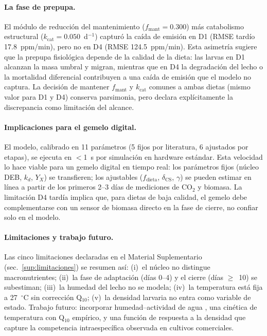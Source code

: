\paragraph{La fase de prepupa.}
El m\'{o}dulo de reducci\'{o}n del mantenimiento ($f_{\mathrm{mant}}=0.300$)
m\'{a}s catabolismo estructural ($k_{\mathrm{cat}}=0.050$~d$^{-1}$)
captur\'{o} la ca\'{i}da de emisi\'{o}n en D1 (RMSE tard\'{i}o 17.8~ppm/min),
pero no en D4 (RMSE 124.5~ppm/min). Esta asimetr\'{i}a sugiere que la
prepupa fisiol\'{o}gica depende de la calidad de la dieta: las larvas
en D1 alcanzan la masa umbral y migran, mientras que en D4 la
degradaci\'{o}n del lecho o la mortalidad diferencial contribuyen a
una ca\'{i}da de emisi\'{o}n que el modelo no captura. La decisi\'{o}n
de mantener $f_{\mathrm{mant}}$ y $k_{\mathrm{cat}}$ comunes a ambas
dietas (mismo valor para D1 y D4) conserva parsimonia, pero declara
expl\'{i}citamente la discrepancia como limitaci\'{o}n del alcance.

\paragraph{Implicaciones para el gemelo digital.}
El modelo, calibrado en 11 par\'{a}metros (5 fijos por literatura, 6
ajustados por etapas), se ejecuta en $<$1~s por simulaci\'{o}n en
hardware est\'{a}ndar. Esta velocidad lo hace viable para un gemelo
digital en tiempo real: los par\'{a}metros fijos (n\'{u}cleo DEB,
$k_d$, $Y_X$) se transfieren; los ajustables ($f_{\mathrm{dieta}}$,
$\delta_{\mathrm{CS}}$, $\gamma$) se pueden estimar en l\'{i}nea a
partir de los primeros 2--3 d\'{i}as de mediciones de CO$_2$ y
biomasa. La limitaci\'{o}n D4 tard\'{i}a implica que, para dietas de
baja calidad, el gemelo debe complementarse con un sensor de biomasa
directo en la fase de cierre, no confiar solo en el modelo.

\paragraph{Limitaciones y trabajo futuro.}
Las cinco limitaciones declaradas en el Material Suplementario
(sec.~\ref{sup:limitaciones}) se resumen as\'{i}: (i)~el n\'{u}cleo
no distingue macronutrientes; (ii)~la fase de adaptaci\'{o}n (d\'{i}as
0--4) y el cierre (d\'{i}as $\geq$~10) se subestiman; (iii)~la
humedad del lecho no se modela; (iv)~la temperatura est\'{a} fija a
27~$^{\circ}$C sin correcci\'{o}n Q$_{10}$; (v)~la densidad larvaria
no entra como variable de estado. Trabajo futuro: incorporar
humedad--actividad de agua \parencite{bekkerImpactSubstrateMoisture2021a},
una cin\'{e}tica de temperatura con Q$_{10}$ emp\'{i}rico, y una
funci\'{o}n de respuesta a la densidad que capture la competencia
intraespec\'{i}fica observada en cultivos comerciales.

